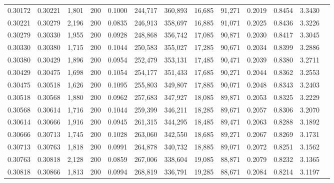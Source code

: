 \begin{tabular}{rrrrrrrrrrrrr}
0.30172 & 0.30221 & 1,801 & 200 &                                     0.1000 & 244,717 & 360,893 &  16,685 &  91,271 & 0.2019 & 0.8454 & 3.3430 \\
0.30221 & 0.30279 & 2,196 & 200 &                                     0.0835 & 246,913 & 358,697 &  16,885 &  91,071 & 0.2025 & 0.8436 & 3.3226 \\
0.30279 & 0.30330 & 1,955 & 200 &                                     0.0928 & 248,868 & 356,742 &  17,085 &  90,871 & 0.2030 & 0.8417 & 3.3045 \\
0.30330 & 0.30380 & 1,715 & 200 &                                     0.1044 & 250,583 & 355,027 &  17,285 &  90,671 & 0.2034 & 0.8399 & 3.2886 \\
0.30380 & 0.30429 & 1,896 & 200 &                                     0.0954 & 252,479 & 353,131 &  17,485 &  90,471 & 0.2039 & 0.8380 & 3.2711 \\
0.30429 & 0.30475 & 1,698 & 200 &                                     0.1054 & 254,177 & 351,433 &  17,685 &  90,271 & 0.2044 & 0.8362 & 3.2553 \\
0.30475 & 0.30518 & 1,626 & 200 &                                     0.1095 & 255,803 & 349,807 &  17,885 &  90,071 & 0.2048 & 0.8343 & 3.2403 \\
0.30518 & 0.30568 & 1,880 & 200 &                                     0.0962 & 257,683 & 347,927 &  18,085 &  89,871 & 0.2053 & 0.8325 & 3.2229 \\
0.30568 & 0.30614 & 1,716 & 200 &                                     0.1044 & 259,399 & 346,211 &  18,285 &  89,671 & 0.2057 & 0.8306 & 3.2070 \\
0.30614 & 0.30666 & 1,916 & 200 &                                     0.0945 & 261,315 & 344,295 &  18,485 &  89,471 & 0.2063 & 0.8288 & 3.1892 \\
0.30666 & 0.30713 & 1,745 & 200 &                                     0.1028 & 263,060 & 342,550 &  18,685 &  89,271 & 0.2067 & 0.8269 & 3.1731 \\
0.30713 & 0.30763 & 1,818 & 200 &                                     0.0991 & 264,878 & 340,732 &  18,885 &  89,071 & 0.2072 & 0.8251 & 3.1562 \\
0.30763 & 0.30818 & 2,128 & 200 &                                     0.0859 & 267,006 & 338,604 &  19,085 &  88,871 & 0.2079 & 0.8232 & 3.1365 \\
0.30818 & 0.30866 & 1,813 & 200 &                                     0.0994 & 268,819 & 336,791 &  19,285 &  88,671 & 0.2084 & 0.8214 & 3.1197 \\

\end{tabular}
